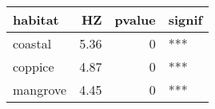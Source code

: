 
\begin{tabular}{lrrl}
\toprule
habitat & HZ & pvalue & signif\\
\midrule
coastal & 5.36 & 0 & ***\\
coppice & 4.87 & 0 & ***\\
mangrove & 4.45 & 0 & ***\\
\bottomrule
\end{tabular}
